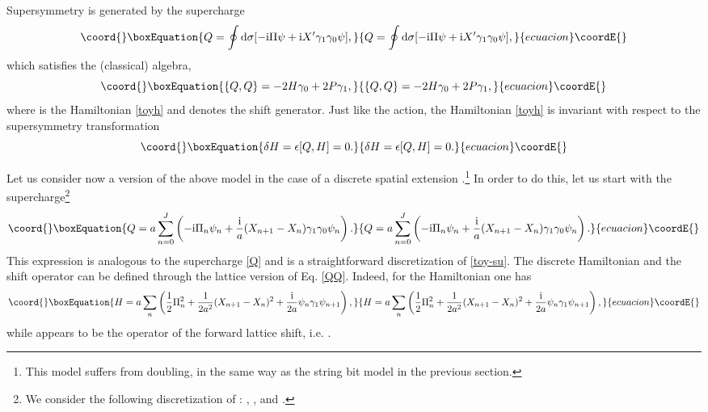 \documentclass[a4paper]{article}
\providecommand{\ii}{\mathrm{i}}
\providecommand{\dd}{\mathrm{d}}
\begin{document}
Supersymmetry is generated by the supercharge
\begin{equation}\coord{}\boxEquation{\label{toy-su}
  Q=\oint\dd \sigma[-\ii\Pi\psi+\ii X'\gamma_1\gamma_0\psi],
}{Q=\oint\dd \sigma[-\ii\Pi\psi+\ii X'\gamma_1\gamma_0\psi],
}{ecuacion}\coordE{}\end{equation}
which satisfies the (classical) algebra,
\begin{equation}\coord{}\boxEquation{\label{QQ}
  \{Q,Q\}=-2H\gamma_0+2P\gamma_1,
}{\{Q,Q\}=-2H\gamma_0+2P\gamma_1,
}{ecuacion}\coordE{}\end{equation}
where \coordHE{} is the Hamiltonian \eqref{toyh} and \coordHE{} denotes
the shift generator.
Just like the action, the Hamiltonian \eqref{toyh} is invariant
with respect to the supersymmetry transformation
\begin{equation}\coord{}\boxEquation{
  \delta H=\epsilon [Q,H]=0.
}{
  \delta H=\epsilon [Q,H]=0.
}{ecuacion}\coordE{}\end{equation}

Let us consider now a version of the above model in the case of a
discrete spatial extension \coordHE{}.\footnote{This
model suffers from doubling, in the same way as the string bit
model in the previous section.} In order to do this, let us start
with the supercharge\footnote{We consider the following
discretization of \myHighlight{$\sigma$}\coordHE{}: \coordHE{}, \coordHE{}, and
\coordHE{}.}
\begin{equation}\coord{}\boxEquation{\label{discr-su}
  Q=a\sum_{n=0}^J\left(-\ii
  \Pi_n\psi_n+\frac{\ii}{a}(X_{n+1}-X_n)\gamma_1\gamma_0\psi_n\right).
}{Q=a\sum_{n=0}^J\left(-\ii
  \Pi_n\psi_n+\frac{\ii}{a}(X_{n+1}-X_n)\gamma_1\gamma_0\psi_n\right).
}{ecuacion}\coordE{}\end{equation}
This expression is analogous to the supercharge \eqref{Q} and is a
straightforward discretization of \eqref{toy-su}. The discrete
Hamiltonian and the shift operator can be defined through the
lattice version of Eq. \eqref{QQ}. Indeed, for the Hamiltonian one
has
\begin{equation}\coord{}\boxEquation{\label{toy-discr-h}
  H=a\sum_n\left(\frac{1}{2}\Pi^2_n+\frac{1}{2a^2}(X_{n+1}-X_n)^2+
  \frac{\ii}{2a}\psi_n\gamma_1\psi_{n+1}\right),
}{H=a\sum_n\left(\frac{1}{2}\Pi^2_n+\frac{1}{2a^2}(X_{n+1}-X_n)^2+
  \frac{\ii}{2a}\psi_n\gamma_1\psi_{n+1}\right),
}{ecuacion}\coordE{}\end{equation}
while \coordHE{} appears to be the operator of the forward lattice shift,
i.e. \coordHE{}.
\end{document}
